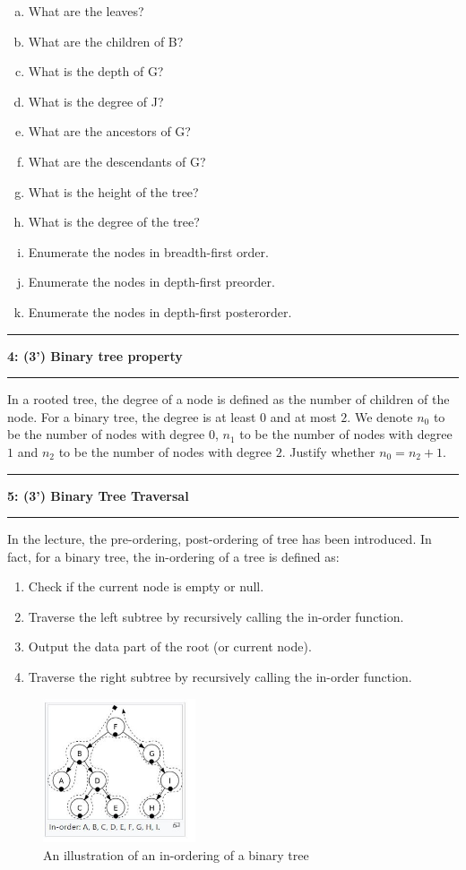 \documentclass[10.5pt]{article}
\newcommand\question[2]{\vspace{.25in}\hrule\textbf{#1: #2}\vspace{.5em}\hrule\vspace{.10in}}
\begin{document}
	\begin{enumerate}[(a)]
		\item What are the leaves? 
		\item What are the children of B? 
		\item What is the depth of G? 
		\item What is the degree of J? 
		\item What are the ancestors of G? 
		\item What are the descendants of G? 
		\item What is the height of the tree? 
		\item What is the degree of the tree? 
		\item Enumerate the nodes in breadth-first order. 
		\item Enumerate the nodes in depth-first preorder. 
		\item Enumerate the nodes in depth-first posterorder. 
	\end{enumerate}
	
	
	\question{4}{(3') Binary tree property}
	In a rooted tree, the degree of a node is defined as the number of children of the node. For a binary tree, the degree is at least $0$ and at most $2$. We denote $n_0$ to be the number of nodes with degree $0$, $n_1$ to be the number of nodes with degree $1$ and $n_2$ to be the number of nodes with degree $2$. Justify whether $n_0 = n_2 + 1$.\\
	\pagebreak
	
	\question{5}{(3') Binary Tree Traversal}
	In the lecture, the pre-ordering, post-ordering of tree has been introduced. In fact, for a binary
	tree, the in-ordering of a tree is defined as:
	\begin{enumerate}[(1)]
		\item Check if the current node is empty or null.
		\item Traverse the left subtree by recursively calling the in-order function.
		\item Output the data part of the root (or current node).
		\item Traverse the right subtree by recursively calling the in-order function.
	\end{enumerate}
	
	\begin{figure}[htpb]
		\centering %
		\includegraphics[width=0.4\textwidth]{in_order.jpg}
		\caption{An illustration of an in-ordering of a binary tree}
	\end{figure}
	
\end{document}
